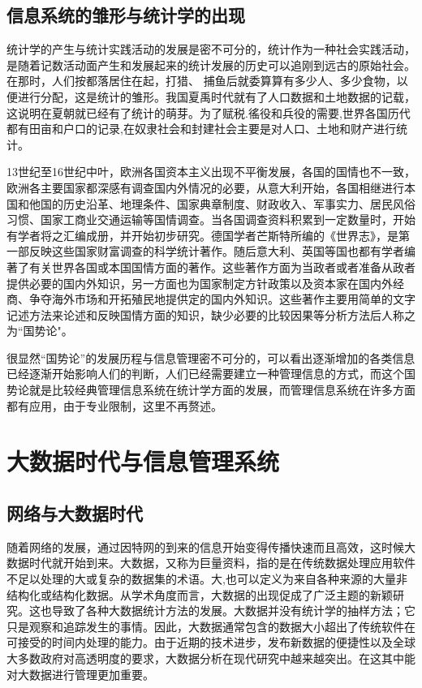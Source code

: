 \documentclass[a4paper,UTF8,cs4size]{ctexart}
\begin{document}
	\subsection{信息系统的雏形与统计学的出现}
	统计学的产生与统计实践活动的发展是密不可分的，统计作为一种社会实践活动，是随着记数活动面产生和发展起来的统计发展的历史可以追刚到远古的原始社会。在那时，人们按都落居住在起，打猎、 捕鱼后就委算算有多少人、多少食物，以便进行分配，这是统计的雏形。我国夏禹时代就有了人口数据和土地数据的记载，这说明在夏朝就已经有了统计的萌芽。为了赋税.徭役和兵役的需要,世界各国历代都有田亩和户口的记录,在奴隶社会和封建社会主要是对人口、土地和财产进行统计。\par
	13世纪至16世纪中叶，欧洲各国资本主义出现不平衡发展，各国的国情也不一致，欧洲各主要国家都深感有调查国内外情况的必要，从意大利开始，各国相继进行本国和他国的历史沿革、地理条件、国家典章制度、财政收入、军事实力、居民风俗习惯、国家工商业交通运输等国情调查。当各国调查资料积累到一定数量时，开始有学者将之汇编成册，并开始初步研究。德国学者芒斯特所编的《世界志》，是第一部反映这些国家财富调查的科学统计著作。随后意大利、英国等国也都有学者编著了有关世界各国或本国国情方面的著作。这些著作方面为当政者或者准备从政者提供必要的国内外知识，另一方面也为国家制定方针政策以及资本家在国内外经商、争夺海外市场和开拓殖民地提供定的国内外知识。这些著作主要用简单的文字记述方法来论述和反映国情方面的知识，缺少必要的比较因果等分析方法后人称之为“国势论"。\cite{q1}\par
	很显然“国势论”的发展历程与信息管理密不可分的，可以看出逐渐增加的各类信息已经逐渐开始影响人们的判断，人们已经需要建立一种管理信息的方式，而这个国势论就是比较经典管理信息系统在统计学方面的发展，而管理信息系统在许多方面都有应用，由于专业限制，这里不再赘述。\par
	\section{大数据时代与信息管理系统}
	\subsection{网络与大数据时代}
	随着网络的发展，通过因特网的到来的信息开始变得传播快速而且高效，这时候大数据时代就开始到来。大数据，又称为巨量资料，指的是在传统数据处理应用软件不足以处理的大或复杂的数据集的术语。大,也可以定义为来自各种来源的大量非结构化或结构化数据。从学术角度而言，大数据的出现促成了广泛主题的新颖研究。这也导致了各种大数据统计方法的发展。大数据并没有统计学的抽样方法；它只是观察和追踪发生的事情。因此，大数据通常包含的数据大小超出了传统软件在可接受的时间内处理的能力。由于近期的技术进步，发布新数据的便捷性以及全球大多数政府对高透明度的要求，大数据分析在现代研究中越来越突出。在这其中能对大数据进行管理更加重要。\cite{q2}\par
\end{document}
